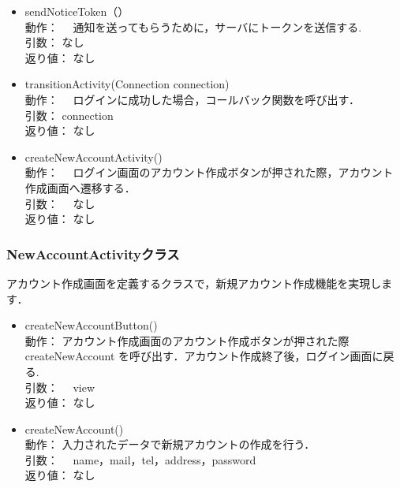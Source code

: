\documentclass[a4j,titlepage]{jarticle}
\begin{document}
\begin{itemize}
  \item sendNoticeToken（）\\
  動作： 　通知を送ってもらうために，サーバにトークンを送信する.\\
  引数： なし\\
  返り値： なし

  \item transitionActivity(Connection connection)\\
  動作： 　ログインに成功した場合，コールバック関数を呼び出す．\\
  引数：  connection\\
  返り値： なし

  \item createNewAccountActivity()\\
  動作： 　ログイン画面のアカウント作成ボタンが押された際，アカウント作成画面へ遷移する．\\
  引数： 　なし\\
  返り値： なし
\end{itemize}


\subsubsection{NewAccountActivityクラス}
アカウント作成画面を定義するクラスで，新規アカウント作成機能を実現します．
\begin{itemize}
  \item createNewAccountButton()\\
動作：  アカウント作成画面のアカウント作成ボタンが押された際 createNewAccount を呼び出す．アカウント作成終了後，ログイン画面に戻る.\\
  引数： 　view\\
  返り値： なし

 \item createNewAccount()\\
  動作：  入力されたデータで新規アカウントの作成を行う．\\
  引数： 　name，mail，tel，address，password\\
  返り値： なし
\end{itemize}
\end{document}
